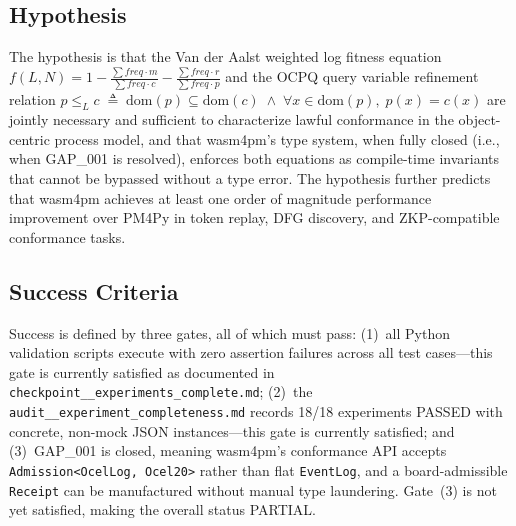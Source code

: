 \subsection{Hypothesis}
\label{sec:experiments-core-rq-hypothesis}

The hypothesis is that the Van der Aalst weighted log fitness equation
$f(L,N) = 1 - \frac{\sum \mathit{freq} \cdot m}{\sum \mathit{freq} \cdot c} - \frac{\sum \mathit{freq} \cdot r}{\sum \mathit{freq} \cdot p}$
and the OCPQ query variable refinement relation
$p \leq_L c \;\triangleq\; \mathrm{dom}(p) \subseteq \mathrm{dom}(c) \;\wedge\; \forall x \in \mathrm{dom}(p),\; p(x) = c(x)$
are jointly necessary and sufficient to characterize lawful conformance in the
object-centric process model, and that wasm4pm's type system, when fully closed
(i.e., when GAP\_001 is resolved), enforces both equations as compile-time invariants
that cannot be bypassed without a type error. The hypothesis further predicts that
wasm4pm achieves at least one order of magnitude performance improvement over PM4Py
in token replay, DFG discovery, and ZKP-compatible conformance tasks.

\subsection{Success Criteria}
\label{sec:experiments-core-rq-success}

Success is defined by three gates, all of which must pass: (1)~all Python validation
scripts execute with zero assertion failures across all test cases---this gate is
currently satisfied as documented in \texttt{checkpoint\_\_experiments\_complete.md};
(2)~the \texttt{audit\_\_experiment\_completeness.md} records 18/18 experiments PASSED
with concrete, non-mock JSON instances---this gate is currently satisfied; and
(3)~GAP\_001 is closed, meaning wasm4pm's conformance API accepts
\texttt{Admission<OcelLog, Ocel20>} rather than flat \texttt{EventLog}, and a
board-admissible \texttt{Receipt} can be manufactured without manual type laundering.
Gate~(3) is not yet satisfied, making the overall status PARTIAL.
